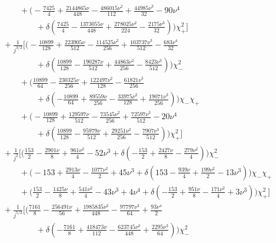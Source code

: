 \documentclass[prd,superscriptaddress,preprintnumbers,tightenlines,nofootinbib, eqsecnum]{revtex4-2}
\newcommand{\nn}{\nonumber}
\begin{document}
\begin{align}
   & \qquad\qquad  +\Bigg(-\frac{7425}{4}+\frac{2144865 \nu }{448}-\frac{486015 \nu ^2}{112}+\frac{44985 \nu ^3}{32}-90 \nu ^4  \nn\\
   &\qquad\qquad\qquad +\delta 
   \left(\frac{7425}{4}-\frac{1373055 \nu }{448}+\frac{278025 \nu ^2}{224}-\frac{2175 \nu ^3}{32}\right)\Bigg) \chi_{+}^2\Bigg]\nn\\
   & \qquad +\frac{1}{j^{3/2}}\Bigg[\Bigg(-\frac{10899}{128}+\frac{223905 \nu
   }{512}-\frac{114525 \nu ^2}{256}+\frac{103737 \nu ^3}{512}-\frac{683 \nu ^4}{32}   \nn\\
   &\qquad\qquad\qquad +\delta  \left(\frac{10899}{128}-\frac{190287 \nu }{512}+\frac{44863 \nu ^2}{256}-\frac{8423 \nu
   ^3}{512}\right)\Bigg) \chi_{-}^2\nn\\
   &\qquad\qquad +\Bigg(\frac{10899}{64}-\frac{230325 \nu }{256}+\frac{122497 \nu ^2}{128}-\frac{61821 \nu ^3}{256} \nn\\
   &\qquad\qquad\qquad +\delta  \left(-\frac{10899}{64}+\frac{89559 \nu
   }{256}-\frac{33975 \nu ^2}{128}+\frac{19071 \nu ^3}{256}\right)\Bigg) \chi_{-} \chi_{+} \nn\\
   &\qquad\qquad +\Bigg(-\frac{10899}{128}+\frac{129597 \nu }{512}-\frac{73545 \nu ^2}{256}+\frac{72597 \nu
   ^3}{512}-20 \nu ^4 \nn\\
   &\qquad\qquad\qquad +\delta  \left(\frac{10899}{128}-\frac{95979 \nu }{512}+\frac{29251 \nu ^2}{256}-\frac{7907 \nu ^3}{512}\right)\Bigg) \chi_{+}^2\Bigg]\nn\\
   &\qquad +\frac{1}{j^2}\Bigg[\Bigg(\frac{153}{2}-\frac{2901 \nu }{8}+\frac{961 \nu ^2}{4}-52 \nu ^3+\delta  \left(-\frac{153}{2}+\frac{2427 \nu }{8}-\frac{279 \nu ^2}{4}\right)\Bigg) \chi_{-}^2 \nn\\
   &\qquad\qquad +\Bigg(-153+\frac{2913 \nu }{4}-\frac{1077 \nu ^2}{2}+45 \nu ^3+\delta  \left(153-\frac{939 \nu }{4}+\frac{199 \nu ^2}{2}-13 \nu ^3\right)\Bigg) \chi_{-} \chi_{+} \nn\\
   &\qquad\qquad +\Bigg(\frac{153}{2}-\frac{1425 \nu }{8}+\frac{541 \nu ^2}{4}-43 \nu ^3+4 \nu ^4+\delta  \left(-\frac{153}{2}+\frac{951 \nu }{8}-\frac{171 \nu ^2}{4}+3 \nu ^3\right)\Bigg) \chi_{+}^2 \Bigg]\nn\\
   &\qquad +\frac{1}{j^{5/2}}\Bigg[\Bigg(\frac{7161}{8}-\frac{256491 \nu }{56}+\frac{1985835 \nu ^2}{448}-\frac{97797 \nu ^3}{64}+\frac{93 \nu ^4}{2} \nn\\
   &\qquad\qquad\qquad +\delta  \left(-\frac{7161}{8}+\frac{418473 \nu
   }{112}-\frac{623745 \nu ^2}{448}+\frac{2295 \nu ^3}{64}\right)\Bigg) \chi_{-}^2 \nn\\

\end{align}
\end{document}
